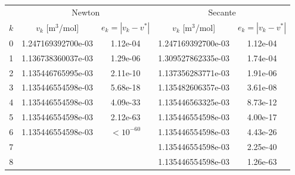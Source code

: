 \begin{tabular}{r cc cc}
\toprule
 & \multicolumn{2}{c}{Newton} & \multicolumn{2}{c}{Secante}\\
$k$ & $v_k$ [m$^3$/mol] & $e_k=|v_k-v^*|$ & $v_k$ [m$^3$/mol] & $e_k=|v_k-v^*|$\\
\midrule
0 & 1.247169392700e-03 & 1.12e-04 & 1.247169392700e-03 & 1.12e-04\\
1 & 1.136738360037e-03 & 1.29e-06 & 1.309527862335e-03 & 1.74e-04\\
2 & 1.135446765995e-03 & 2.11e-10 & 1.137356283771e-03 & 1.91e-06\\
3 & 1.135446554598e-03 & 5.68e-18 & 1.135482606357e-03 & 3.61e-08\\
4 & 1.135446554598e-03 & 4.09e-33 & 1.135446563325e-03 & 8.73e-12\\
5 & 1.135446554598e-03 & 2.12e-63 & 1.135446554598e-03 & 4.00e-17\\
6 & 1.135446554598e-03 & $<10^{-60}$ & 1.135446554598e-03 & 4.43e-26\\
7 &  &  & 1.135446554598e-03 & 2.25e-40\\
8 &  &  & 1.135446554598e-03 & 1.26e-63\\
\bottomrule
\end{tabular}
